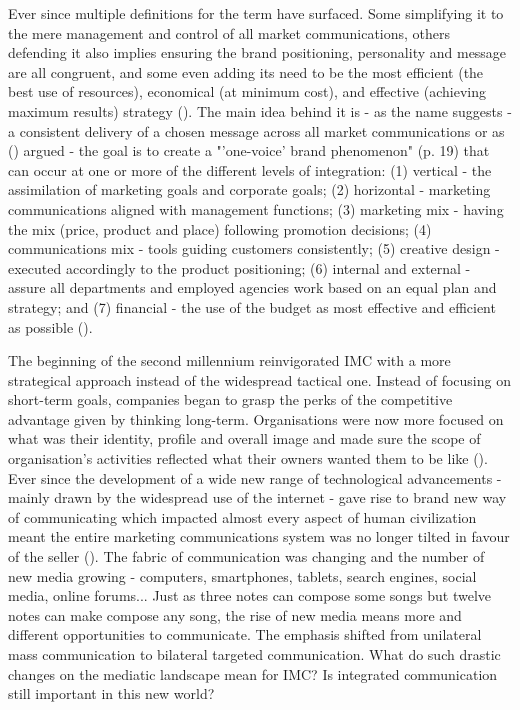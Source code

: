 \documentclass[12pt]{article}
\begin{document}
Ever since multiple definitions for the term have surfaced. Some simplifying it to the mere management and control of all market communications, others defending it also implies ensuring the brand positioning, personality and message are all congruent, and some even adding its need to be the most efficient (the best use of resources), economical (at minimum cost), and effective (achieving maximum results) strategy (\cite{smith}). The main idea behind it is - as the name suggests - a consistent delivery of a chosen message across all market communications or as  \citeauthor{kitchen} (\citeyear{kitchen}) argued - the goal is to create a "'one-voice' brand phenomenon" (p. 19) that can occur at one or more of the different levels of integration: (1) vertical - the assimilation of marketing goals and corporate goals; (2) horizontal - marketing communications aligned with management functions; (3) marketing mix - having the mix (price, product and place) following promotion decisions; (4) communications mix - tools guiding customers consistently; (5) creative design - executed accordingly to the product positioning; (6) internal and external - assure all departments and employed agencies work based on an equal plan and strategy; and (7) financial - the use of the budget as most effective and efficient as possible (\cite{smith}). 

The beginning of the second millennium reinvigorated IMC with a more strategical approach instead of the widespread tactical one. Instead of focusing on short-term goals, companies began to grasp the perks of the competitive advantage given by thinking long-term. Organisations were now more focused on what was their identity, profile and overall image and made sure the scope of organisation's activities reflected what their owners wanted them to be like (\cite{holm}). Ever since the development of a wide new range of technological advancements - mainly drawn by the widespread use of the internet - gave rise to brand new way of communicating which impacted almost every aspect of human civilization meant the entire marketing communications system was no longer tilted in favour of the seller (\cite{kliatchko}). The fabric of communication was changing and the number of new media growing - computers, smartphones, tablets, search engines, social media, online forums...  Just as three notes can compose some songs but twelve notes can make compose any song, the rise of new media means more and different opportunities to communicate. The emphasis shifted from unilateral mass communication to bilateral targeted communication. What do such drastic changes on the mediatic landscape mean for IMC? Is integrated communication still important in this new world?
\end{document}
